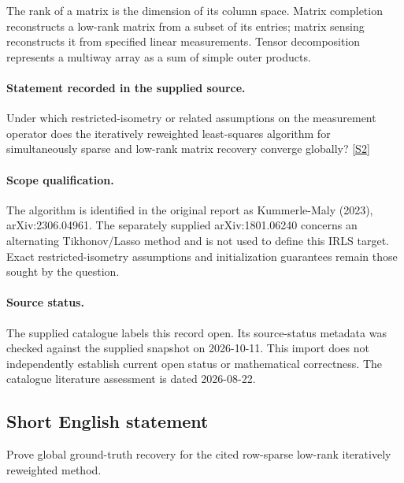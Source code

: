 \documentclass[11pt]{article}
\begin{document}
The rank of a matrix is the dimension of its column space. Matrix completion reconstructs a low-rank matrix from a subset of its entries; matrix sensing reconstructs it from specified linear measurements. Tensor decomposition represents a multiway array as a sum of simple outer products.
\paragraph{Statement recorded in the supplied source.}
Under which restricted-isometry or related assumptions on the measurement operator does the iteratively reweighted least-squares algorithm for simultaneously sparse and low-rank matrix recovery converge globally? \href{https://doi.org/10.4171/owr/2024/21}{[S2]}
\paragraph{Scope qualification.}
The algorithm is identified in the original report as Kummerle-Maly (2023), arXiv:2306.04961. The separately supplied arXiv:1801.06240 concerns an alternating Tikhonov/Lasso method and is not used to define this IRLS target. Exact restricted-isometry assumptions and initialization guarantees remain those sought by the question.
\paragraph{Source status.}
The supplied catalogue labels this record open. Its source-status metadata was checked against the supplied snapshot on 2026-10-11. This import does not independently establish current open status or mathematical correctness. The catalogue literature assessment is dated 2026-08-22.
\subsection{Short English statement}
Prove global ground-truth recovery for the cited row-sparse low-rank iteratively reweighted method.
\end{document}
